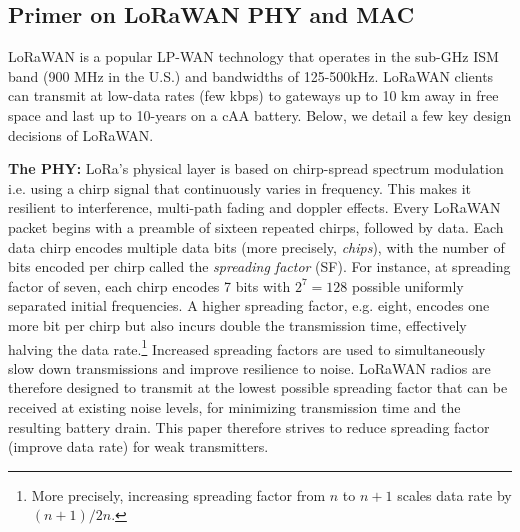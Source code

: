 \subsection{Primer on LoRaWAN PHY and MAC}
\label{sec:lora}

LoRaWAN is a popular LP-WAN technology that operates in the sub-GHz ISM band (900 MHz in the U.S.) and bandwidths of 125-500kHz. LoRaWAN clients can transmit at low-data rates (few kbps) to gateways up to 10 km away in free space and last up to 10-years on a cAA battery. Below, we detail a few key design decisions of LoRaWAN.\vspace*{0.02in}

\noindent \textbf{The PHY: } LoRa's physical layer is based on chirp-spread spectrum modulation i.e. using a chirp signal that continuously varies in frequency. This makes it resilient to interference, multi-path fading and doppler effects. Every LoRaWAN packet begins with a preamble of sixteen repeated chirps, followed by data. Each data chirp encodes multiple data bits (more precisely, \textit{chips}), with the number of  bits encoded per chirp called the \textit{spreading factor} (SF). For instance, at spreading factor of seven, each chirp encodes 7 bits with $2^7 = 128$ possible uniformly separated initial frequencies. A higher spreading factor, e.g. eight, encodes one more bit per chirp but also incurs double the transmission time, effectively halving the data rate.\footnote{More precisely, increasing spreading factor from $n$ to $n+1$ scales data rate by $(n+1)/2n$.} Increased spreading factors are used to simultaneously slow down transmissions and improve resilience to noise. LoRaWAN radios are therefore designed to transmit at the lowest possible spreading factor that can be received at existing noise levels, for minimizing transmission time and the resulting battery drain. This paper therefore strives to reduce spreading factor (improve data rate) for weak transmitters. 



